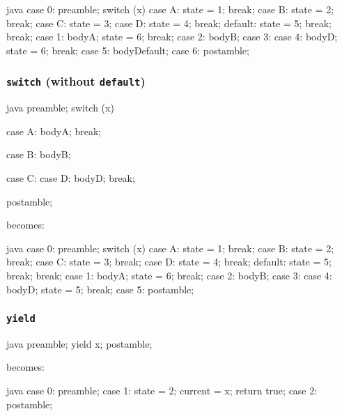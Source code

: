 \documentclass[journal,a4paper]{IEEEtran}
\begin{document}
\begin{pygmented}{java}
case 0:
    preamble;
    switch (x) {
        case A:
            state = 1;
            break;
        case B:
            state = 2;
            break;
        case C:
            state = 3;
        case D:
            state = 4;
            break;
        default:
            state = 5;
            break;
    }
    break;
case 1:
    bodyA;
    state = 6;
    break;
case 2:
    bodyB;
case 3:
case 4:
    bodyD;
    state = 6;
    break;
case 5:
    bodyDefault;
case 6:
    postamble;
\end{pygmented}


\subsubsection{\texttt{switch} (without \texttt{default})}

\begin{pygmented}{java}
preamble;
switch (x) {
    case A:
        bodyA;
        break;

    case B:
        bodyB;

    case C:
    case D:
        bodyD;
        break;
}
postamble;
\end{pygmented}

becomes:

\begin{pygmented}{java}
case 0:
    preamble;
    switch (x) {
        case A:
            state = 1;
            break;
        case B:
            state = 2;
            break;
        case C:
            state = 3;
            break;
        case D:
            state = 4;
            break;
        default:
            state = 5;
            break;
    }
    break;
case 1:
    bodyA;
    state = 6;
    break;
case 2:
    bodyB;
case 3:
case 4:
    bodyD;
    state = 5;
    break;
case 5:
    postamble;
\end{pygmented}

\subsubsection{\texttt{yield}}

\begin{pygmented}{java}
preamble;
yield x;
postamble;
\end{pygmented}

becomes:

\begin{pygmented}{java}
case 0:
    preamble;
case 1:
    state = 2;
    current = x;
    return true;
case 2:
    postamble;
\end{pygmented}
\end{document}
